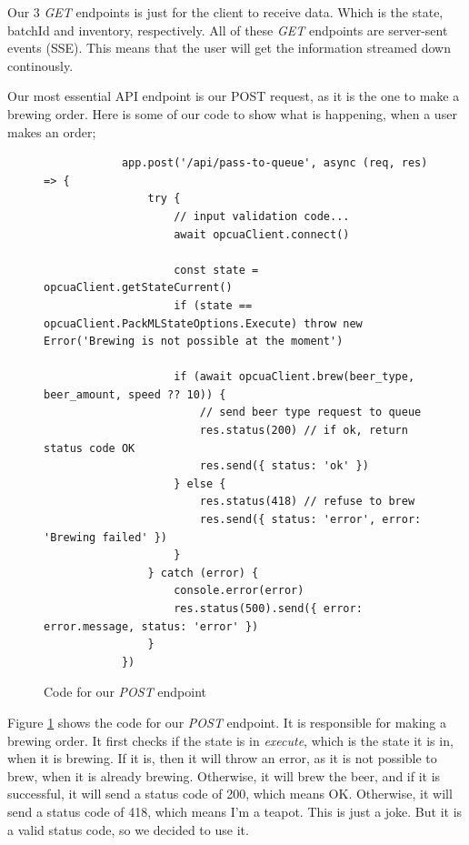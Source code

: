 Our 3 \textit{GET} endpoints is just for the client to receive data. Which is the state, batchId and inventory, respectively.
All of these \textit{GET} endpoints are server-sent events (SSE). This means that the user will get the information streamed down continously. \newline

Our most essential API endpoint is our POST request, as it is the one to make a brewing order. Here is some of our code to show what is happening, when a user makes an order;

\begin{center}
    \centering
    \begin{figure}[H]
        \begin{verbatim}
            app.post('/api/pass-to-queue', async (req, res) => {
                try {
                    // input validation code...
                    await opcuaClient.connect()
        
                    const state = opcuaClient.getStateCurrent()
                    if (state == opcuaClient.PackMLStateOptions.Execute) throw new Error('Brewing is not possible at the moment')
        
                    if (await opcuaClient.brew(beer_type, beer_amount, speed ?? 10)) {
                        // send beer type request to queue
                        res.status(200) // if ok, return status code OK
                        res.send({ status: 'ok' })
                    } else {
                        res.status(418) // refuse to brew
                        res.send({ status: 'error', error: 'Brewing failed' })
                    }
                } catch (error) {
                    console.error(error)
                    res.status(500).send({ error: error.message, status: 'error' })
                }
            })
        \end{verbatim}
        \caption{Code for our \textit{POST} endpoint}
        \label{fig:pass_to_queue_api}
    \end{figure}
\end{center}
Figure \ref{fig:pass_to_queue_api} shows the code for our \textit{POST} endpoint. It is responsible for making a brewing order. It first checks if the state is in \textit{execute}, which is the state it is in, when it is brewing. If it is, then it will throw an error, as it is not possible to brew, when it is already brewing. Otherwise, it will brew the beer, and if it is successful, it will send a status code of 200, which means OK. Otherwise, it will send a status code of 418, which means I'm a teapot. This is just a joke. But it is a valid status code, so we decided to use it.

